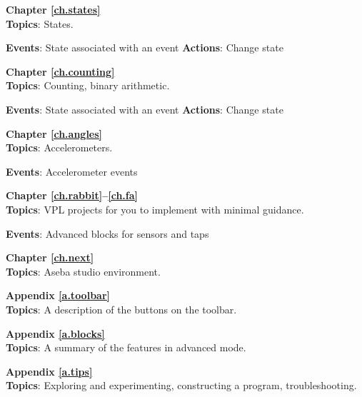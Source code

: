  \hfill {}

\bigskip

{\centering \textbf{Chapter \ref{ch.states}}\\}
\textbf{Topics}: States.

\textbf{Events}: State associated with an event \hfill \textbf{Actions}:
Change state

 \hfill {}

\bigskip

{\centering \textbf{Chapter \ref{ch.counting}}\\}
\textbf{Topics}: Counting, binary arithmetic.

\textbf{Events}: State associated with an event \hfill \textbf{Actions}:
Change state

 \hfill {}

\bigskip

{\centering \textbf{Chapter \ref{ch.angles}}\\}
\textbf{Topics}: Accelerometers.

\textbf{Events}: Accelerometer events

 \quad {}

\bigskip

{\centering \textbf{Chapter \ref{ch.rabbit}--\ref{ch.fa}}\\}
\textbf{Topics}: VPL projects for you to implement with minimal
guidance.

\textbf{Events}: Advanced blocks for sensors and taps

 \quad {}
\quad {}


\bigskip

{\centering \textbf{Chapter \ref{ch.next}}\\}
\textbf{Topics}: Aseba studio environment.

\newpage

{\centering \textbf{Appendix \ref{a.toolbar}}\\}
\textbf{Topics}: A description of the buttons on the toolbar.

\bigskip

{\centering \textbf{Appendix \ref{a.blocks}}\\}
\textbf{Topics}: A summary of the features in advanced mode.

\bigskip
{\centering \textbf{Appendix \ref{a.tips}}\\}
\textbf{Topics}: Exploring and experimenting,
constructing a program, troubleshooting.

